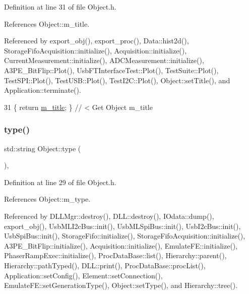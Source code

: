 Definition at line 31 of file Object.\+h.



References Object\+::m\+\_\+title.



Referenced by export\+\_\+obj(), export\+\_\+proc(), Data\+::hist2d(), Storage\+Fifo\+Acquisition\+::initialize(), Acquisition\+::initialize(), Current\+Measurement\+::initialize(), A\+D\+C\+Measurement\+::initialize(), A3\+P\+E\+\_\+\+Bit\+Flip\+::\+Plot(), Usb\+F\+T\+Interface\+Test\+::\+Plot(), Test\+Suite\+::\+Plot(), Test\+S\+P\+I\+::\+Plot(), Test\+U\+S\+B\+::\+Plot(), Test\+I2\+C\+::\+Plot(), Object\+::set\+Title(), and Application\+::terminate().


\begin{DoxyCode}
31 \{ \textcolor{keywordflow}{return} \hyperlink{classObject_affbeea1953eb5163573b92fad8f75727}{m\_title};      \} \textcolor{comment}{// < Get Object m\_title}
\end{DoxyCode}
\mbox{\label{classObject_a84f99f70f144a83e1582d1d0f84e4e62}} 
\subsubsection{\texorpdfstring{type()}{type()}}
{\footnotesize\ttfamily std\+::string Object\+::type (\begin{DoxyParamCaption}{ }\end{DoxyParamCaption})\hspace{0.3cm}{\ttfamily [inline]}, {\ttfamily [inherited]}}



Definition at line 29 of file Object.\+h.



References Object\+::m\+\_\+type.



Referenced by D\+L\+L\+Mgr\+::destroy(), D\+L\+L\+::destroy(), I\+Odata\+::dump(), export\+\_\+obj(), Usb\+M\+L\+I2c\+Bus\+::init(), Usb\+M\+L\+Spi\+Bus\+::init(), Usb\+I2c\+Bus\+::init(), Usb\+Spi\+Bus\+::init(), Storage\+Fifo\+::initialize(), Storage\+Fifo\+Acquisition\+::initialize(), A3\+P\+E\+\_\+\+Bit\+Flip\+::initialize(), Acquisition\+::initialize(), Emulate\+F\+E\+::initialize(), Phaser\+Ramp\+Exec\+::initialize(), Proc\+Data\+Base\+::list(), Hierarchy\+::parent(), Hierarchy\+::path\+Typed(), D\+L\+L\+::print(), Proc\+Data\+Base\+::proc\+List(), Application\+::set\+Config(), Element\+::set\+Connection(), Emulate\+F\+E\+::set\+Generation\+Type(), Object\+::set\+Type(), and Hierarchy\+::tree().


